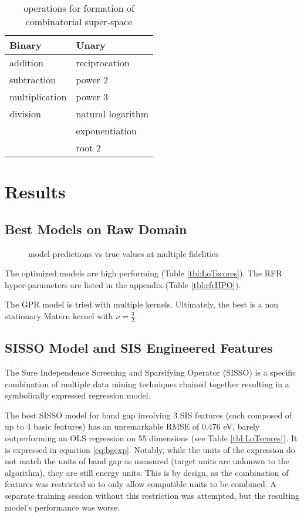 \begin{table}[htbp]
\caption{\label{tbl:ops} operations for formation of combinatorial super-space}
\centering
\begin{tabular}{ll}
Binary & Unary\\[0pt]
\hline
addition & reciprocation\\[0pt]
subtraction & power 2\\[0pt]
multiplication & power 3\\[0pt]
division & natural logarithm\\[0pt]
 & exponentiation\\[0pt]
 & root 2\\[0pt]
\end{tabular}
\end{table}

\section{Results}
\label{sec:orgb4c6d5c}
\subsection{Best Models on Raw Domain}
\label{sec:org458b2cd}
 
\begin{figure}[htbp]
\centering

\caption{\label{fig:pairplots} model predictions vs true values at multiple fidelities}
\end{figure}

The optimized models are high performing (Table \ref{tbl:LoTscores}).
The RFR hyper-parameters are listed in the appendix (Table \ref{tbl:rfrHPO}).

The GPR model is tried with multiple kernels.
Ultimately, the best is a non stationary Matern kernel with \(\nu = \frac{3}{2}\).

\subsection{SISSO Model and SIS Engineered Features}
\label{sec:org0cd4181}
The Sure Independence Screening and Sparsifying Operator (SISSO) is a specific combination of multiple data mining techniques chained together resulting in a symbolically expressed regression model.
\autocite{ouyang-2018-sisso,ghiringhelli-2017-learn-physic} 

The best SISSO model for band gap involving 3 SIS features (each composed of up to 4 basic features) has an unremarkable RMSE of 0.476 eV, barely outperforming an OLS regression on 55 dimensions (see Table \ref{tbl:LoTscores}).
It is expressed in equation \ref{eq:bgexp}.
Notably, while the units of the expression do not match the units of band gap as measured (target units are unknown to the algorithm), they are still energy units.
This is by design, as the combination of features was restricted so to only allow compatible units to be combined.
A separate training session without this restriction was attempted, but the resulting model's performance was worse.

